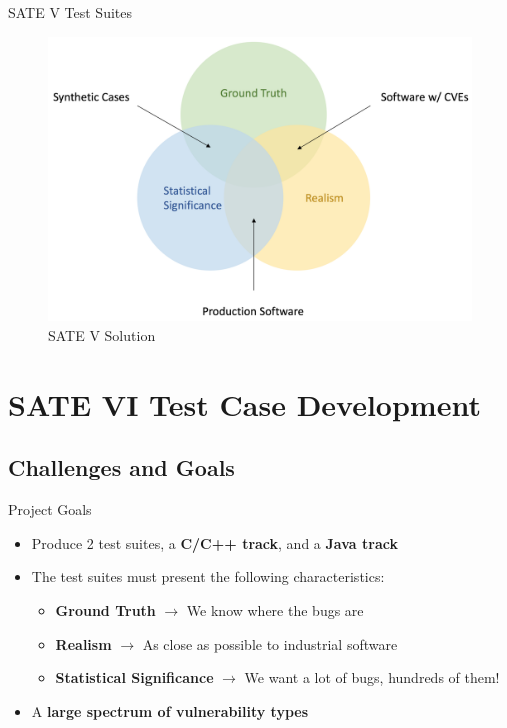 \documentclass[aspectratio=169]{beamer}
\begin{document}
  \begin{frame}{SATE V Test Suites}
    \begin{figure}
      \centering
      \includegraphics[scale=0.33]{figures/sate-v-test-suites}
      \caption{SATE V Solution}
    \end{figure}
  \end{frame}
  
  \section{SATE VI Test Case Development}

  \subsection{Challenges and Goals}

  \begin{frame}{Project Goals}
    \begin{itemize}
    \setlength\itemsep{1em}
    \item Produce 2 test suites, a \textbf{C/C++ track}, and a \textbf{Java track}
    \pause
    \item The test suites must present the following characteristics:
      \vspace{0.3em}
      \begin{itemize}
      \setlength\itemsep{0.5em}
      \item \textbf{Ground Truth} $\rightarrow$ We know where the bugs are
      \item \textbf{Realism} $\rightarrow$ As close as possible to industrial software
      \item \textbf{Statistical Significance} $\rightarrow$ We want a lot of bugs, hundreds of them!
      \end{itemize}
    \pause
    \item A \textbf{large spectrum of vulnerability types}
    \end{itemize}
  \end{frame}
\end{document}
